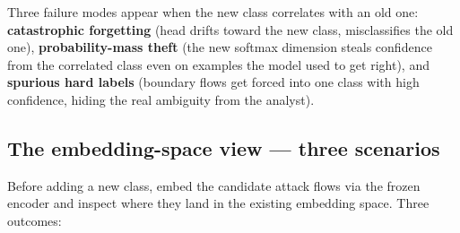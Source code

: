 \documentclass[11pt,a4paper]{article}
\begin{document}
Three failure modes appear when the new class correlates with an old one: \textbf{catastrophic forgetting} (head drifts toward the new class, misclassifies the old one), \textbf{probability-mass theft} (the new softmax dimension steals confidence from the correlated class even on examples the model used to get right), and \textbf{spurious hard labels} (boundary flows get forced into one class with high confidence, hiding the real ambiguity from the analyst).

\subsection{The embedding-space view --- three scenarios}

Before adding a new class, embed the candidate attack flows via the frozen encoder and inspect where they land in the existing embedding space. Three outcomes:
\end{document}
